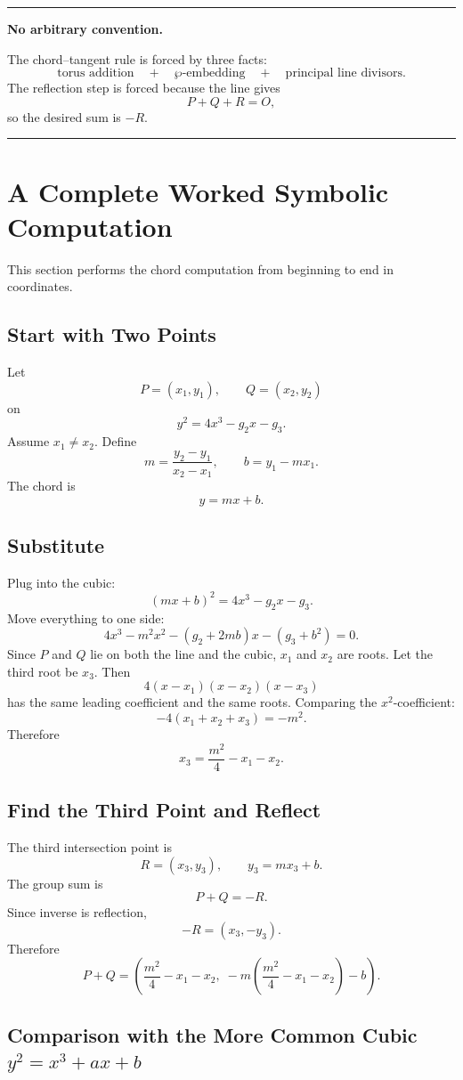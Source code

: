 \documentclass[11pt]{article}
\newenvironment{keyidea}[1]{%
  \par\medskip
  \begin{center}
  \begin{minipage}{0.92\textwidth}
  \hrule
  \smallskip
  \textbf{#1.}\quad\ignorespaces
}{%
  \smallskip
  \hrule
  \end{minipage}
  \end{center}
  \medskip
}
\begin{document}
\begin{keyidea}{No arbitrary convention}
The chord--tangent rule is forced by three facts:
\[
\text{torus addition}
\quad+\quad
\wp\text{-embedding}
\quad+\quad
\text{principal line divisors}.
\]
The reflection step is forced because the line gives
\[
P+Q+R=O,
\]
so the desired sum is \(-R\).
\end{keyidea}

\section{A Complete Worked Symbolic Computation}

This section performs the chord computation from beginning to end in
coordinates.

\subsection{Start with Two Points}

Let
\[
P=(x_1,y_1),
\qquad
Q=(x_2,y_2)
\]
on
\[
y^2=4x^3-g_2x-g_3.
\]
Assume \(x_1\neq x_2\).  Define
\[
m=\frac{y_2-y_1}{x_2-x_1},
\qquad
b=y_1-mx_1.
\]
The chord is
\[
y=mx+b.
\]

\subsection{Substitute}

Plug into the cubic:
\[
(mx+b)^2=4x^3-g_2x-g_3.
\]
Move everything to one side:
\[
4x^3-m^2x^2-(g_2+2mb)x-(g_3+b^2)=0.
\]
Since \(P\) and \(Q\) lie on both the line and the cubic, \(x_1\) and \(x_2\)
are roots.  Let the third root be \(x_3\).  Then
\[
4(x-x_1)(x-x_2)(x-x_3)
\]
has the same leading coefficient and the same roots.  Comparing the
\(x^2\)-coefficient:
\[
-4(x_1+x_2+x_3)=-m^2.
\]
Therefore
\[
x_3=\frac{m^2}{4}-x_1-x_2.
\]

\subsection{Find the Third Point and Reflect}

The third intersection point is
\[
R=(x_3,y_3),
\qquad
y_3=mx_3+b.
\]
The group sum is
\[
P+Q=-R.
\]
Since inverse is reflection,
\[
-R=(x_3,-y_3).
\]
Therefore
\[
\boxed{
P+Q=
\left(
\frac{m^2}{4}-x_1-x_2,\;
-m\left(\frac{m^2}{4}-x_1-x_2\right)-b
\right).
}
\]

\subsection{\texorpdfstring{Comparison with the More Common Cubic \(y^2=x^3+ax+b\)}{Comparison with the More Common Cubic y2=x3+ax+b}}
\end{document}
